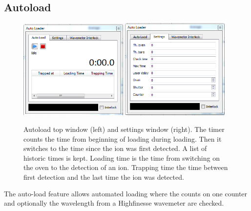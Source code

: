 \documentclass[11pt]{scrartcl}
\begin{document}
\subsection{Autoload}
\begin{figure}[htbp]
\centering
\includegraphics[width=0.48\textwidth]{Autoload}\hfill
\includegraphics[width=0.48\textwidth]{AutoloadSettings}
\caption{\label{Autoload} Autoload top window (left) and settings window (right). The timer counts the time from beginning of loading during loading. Then it switches to the time since the ion was first detected. A list of historic times is kept. Loading time is the time from switching on the oven to the detection of an ion. Trapping time the time between first detection and the last time the ion was detected.}
\end{figure}
The auto-load feature allows automated loading where the counts on one counter and optionally the wavelength from a Highfinesse wavemeter are checked.
\end{document}
